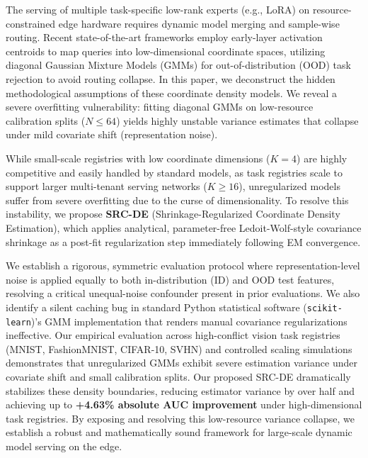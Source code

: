 The serving of multiple task-specific low-rank experts (e.g., LoRA) on resource-constrained edge hardware requires dynamic model merging and sample-wise routing. Recent state-of-the-art frameworks employ early-layer activation centroids to map queries into low-dimensional coordinate spaces, utilizing diagonal Gaussian Mixture Models (GMMs) for out-of-distribution (OOD) task rejection to avoid routing collapse. In this paper, we deconstruct the hidden methodological assumptions of these coordinate density models. We reveal a severe overfitting vulnerability: fitting diagonal GMMs on low-resource calibration splits ($N \le 64$) yields highly unstable variance estimates that collapse under mild covariate shift (representation noise). 

While small-scale registries with low coordinate dimensions ($K=4$) are highly competitive and easily handled by standard models, as task registries scale to support larger multi-tenant serving networks ($K \ge 16$), unregularized models suffer from severe overfitting due to the curse of dimensionality. To resolve this instability, we propose {\bf SRC-DE} (Shrinkage-Regularized Coordinate Density Estimation), which applies analytical, parameter-free Ledoit-Wolf-style covariance shrinkage as a post-fit regularization step immediately following EM convergence.

We establish a rigorous, symmetric evaluation protocol where representation-level noise is applied equally to both in-distribution (ID) and OOD test features, resolving a critical unequal-noise confounder present in prior evaluations. We also identify a silent caching bug in standard Python statistical software (\texttt{scikit-learn})'s GMM implementation that renders manual covariance regularizations ineffective. Our empirical evaluation across high-conflict vision task registries (MNIST, FashionMNIST, CIFAR-10, SVHN) and controlled scaling simulations demonstrates that unregularized GMMs exhibit severe estimation variance under covariate shift and small calibration splits. Our proposed SRC-DE dramatically stabilizes these density boundaries, reducing estimator variance by over half and achieving up to {\bf +4.63\% absolute AUC improvement} under high-dimensional task registries. By exposing and resolving this low-resource variance collapse, we establish a robust and mathematically sound framework for large-scale dynamic model serving on the edge.

